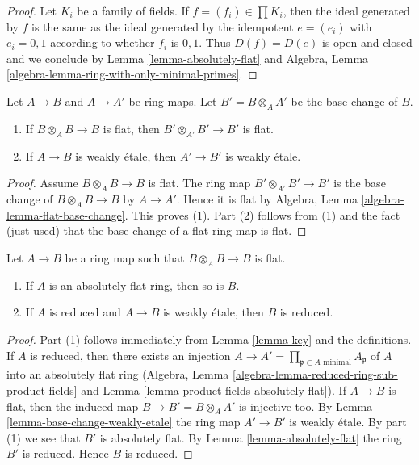 \begin{proof}
Let $K_i$ be a family of fields. If $f = (f_i) \in \prod K_i$, then
the ideal generated by $f$ is the same as the ideal generated by
the idempotent $e = (e_i)$ with $e_i = 0, 1$ according to whether
$f_i$ is $0, 1$. Thus $D(f) = D(e)$ is open and closed and we conclude
by Lemma \ref{lemma-absolutely-flat} and
Algebra, Lemma \ref{algebra-lemma-ring-with-only-minimal-primes}.
\end{proof}

\begin{lemma}
\label{lemma-base-change-weakly-etale}
Let $A \to B$ and $A \to A'$ be ring maps. Let $B' = B \otimes_A A'$
be the base change of $B$.
\begin{enumerate}
\item If $B \otimes_A B \to B$ is flat, then $B' \otimes_{A'} B' \to B'$
is flat.
\item If $A \to B$ is weakly \'etale, then $A' \to B'$ is weakly \'etale.
\end{enumerate}
\end{lemma}

\begin{proof}
Assume $B \otimes_A B \to B$ is flat.
The ring map $B' \otimes_{A'} B' \to B'$ is the base change of
$B \otimes_A B \to B$ by $A \to A'$. Hence it is flat by
Algebra, Lemma \ref{algebra-lemma-flat-base-change}. This proves (1).
Part (2) follows from (1) and the fact (just used) that the
base change of a flat ring map is flat.
\end{proof}

\begin{lemma}
\label{lemma-absolutely-flat-over-absolutely-flat}
Let $A \to B$ be a ring map such that $B \otimes_A B \to B$ is flat.
\begin{enumerate}
\item If $A$ is an absolutely flat ring, then so is $B$.
\item If $A$ is reduced and $A \to B$ is weakly \'etale, then $B$ is reduced.
\end{enumerate}
\end{lemma}

\begin{proof}
Part (1) follows immediately from Lemma \ref{lemma-key} and the definitions.
If $A$ is reduced, then there exists an injection
$A \to A' = \prod_{\mathfrak p \subset A\text{ minimal}} A_\mathfrak p$
of $A$ into an absolutely flat ring
(Algebra, Lemma \ref{algebra-lemma-reduced-ring-sub-product-fields} and
Lemma \ref{lemma-product-fields-absolutely-flat}).
If $A \to B$ is flat, then the induced map $B \to B' = B \otimes_A A'$
is injective too. By Lemma \ref{lemma-base-change-weakly-etale}
the ring map $A' \to B'$ is weakly \'etale.
By part (1) we see that $B'$ is absolutely flat.
By Lemma \ref{lemma-absolutely-flat} the ring $B'$ is reduced.
Hence $B$ is reduced.
\end{proof}

